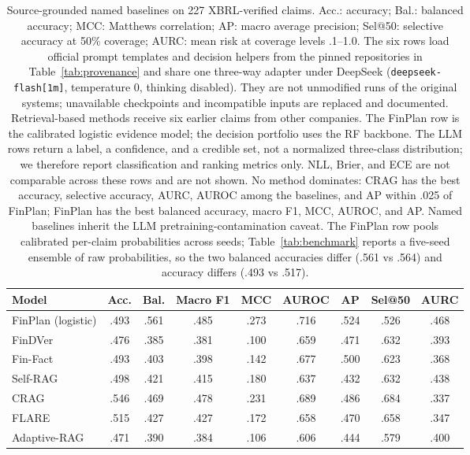 \documentclass[11pt]{article}
\begin{document}
\begin{table}[t]
\centering
\small
\setlength{\tabcolsep}{3pt}
\begin{tabular}{lcccccccc}
\toprule
Model & Acc. & Bal. & Macro F1 & MCC & AUROC & AP & Sel@50 & AURC \\
\midrule
FinPlan (logistic) & .493 & .561 & .485 & .273 & .716 & .524 & .526 & .468 \\
FinDVer & .476 & .385 & .381 & .100 & .659 & .471 & .632 & .393 \\
Fin-Fact & .493 & .403 & .398 & .142 & .677 & .500 & .623 & .368 \\
Self-RAG & .498 & .421 & .415 & .180 & .637 & .432 & .632 & .438 \\
CRAG & .546 & .469 & .478 & .231 & .689 & .486 & .684 & .337 \\
FLARE & .515 & .427 & .427 & .172 & .658 & .470 & .658 & .347 \\
Adaptive-RAG & .471 & .390 & .384 & .106 & .606 & .444 & .579 & .400 \\
\bottomrule
\end{tabular}
\caption{Source-grounded named baselines on 227 XBRL-verified claims. Acc.: accuracy; Bal.: balanced accuracy; MCC: Matthews correlation; AP: macro average precision; Sel@50: selective accuracy at 50\% coverage; AURC: mean risk at coverage levels .1--1.0. The six rows load official prompt templates and decision helpers from the pinned repositories in Table~\ref{tab:provenance} and share one three-way adapter under DeepSeek (\texttt{deepseek-flash[1m]}, temperature 0, thinking disabled). They are not unmodified runs of the original systems; unavailable checkpoints and incompatible inputs are replaced and documented. Retrieval-based methods receive six earlier claims from other companies. The FinPlan row is the calibrated logistic evidence model; the decision portfolio uses the RF backbone. The LLM rows return a label, a confidence, and a credible set, not a normalized three-class distribution; we therefore report classification and ranking metrics only. NLL, Brier, and ECE are not comparable across these rows and are not shown. No method dominates: CRAG has the best accuracy, selective accuracy, AURC, AUROC among the baselines, and AP within .025 of FinPlan; FinPlan has the best balanced accuracy, macro F1, MCC, AUROC, and AP. Named baselines inherit the LLM pretraining-contamination caveat. The FinPlan row pools calibrated per-claim probabilities across seeds; Table~\ref{tab:benchmark} reports a five-seed ensemble of raw probabilities, so the two balanced accuracies differ (.561 vs .564) and accuracy differs (.493 vs .517).}
\label{tab:metrics}
\end{table}
\end{document}
